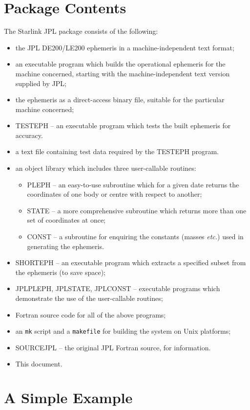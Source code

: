 \documentclass[twoside,11pt]{article}
\newcommand{\xlabel}[1]{}
\renewcommand{\_}{\texttt{\symbol{95}}}
\begin{document}
\section{\xlabel{package_contents}Package Contents}
\label{package_contents}

The Starlink JPL package consists of the following:
\begin{itemize}
\item the JPL DE200/LE200 ephemeris
in a machine-independent text format;
\item an executable program which builds the operational ephemeris
for the machine concerned, starting with the machine-independent
text version supplied by JPL;
\item the ephemeris as a direct-access binary file, suitable for
the particular machine concerned;
\item TESTEPH -- an executable program which tests the built ephemeris for
accuracy.
\item a text file containing test data required
by the TESTEPH program.
\item an object library which includes three user-callable routines:
\begin{itemize}
\item PLEPH -- an easy-to-use subroutine which for a given date
returns the coordinates of one body or centre with respect to another;
\item STATE -- a more comprehensive subroutine which returns more
than one set of coordinates at once;
\item CONST -- a subroutine for enquiring the constants (masses \emph{etc.})
used in generating the ephemeris.
\end{itemize}
\item SHORTEPH -- an executable program which extracts a specified
subset from the ephemeris (to save space);
\item JPLPLEPH, JPLSTATE, JPLCONST -- executable programs which demonstrate
the use of the user-callable routines;
\item Fortran source code for all of the above programs;
\item an \texttt{mk} script and a \texttt{makefile} for building the
system on Unix platforms;
\item SOURCE\_JPL -- the original JPL Fortran source, for information.
\item This document.
\end{itemize}

\section{\xlabel{a_simple_example}A Simple Example}
\label{a_simple_example}
\end{document}
